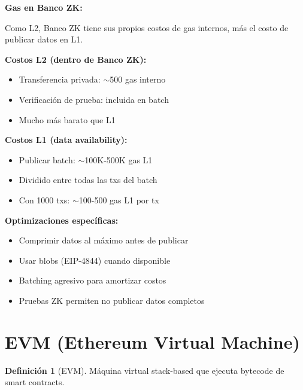 \documentclass[11pt,a4paper,twoside,openright]{book}
\theoremstyle{definition}
\newtheorem{definition}{Definición}[chapter]
\theoremstyle{plain}
\theoremstyle{remark}
\begin{document}
\begin{bancozk}
\textbf{Gas en Banco ZK:}

Como L2, Banco ZK tiene sus propios costos de gas internos, más el costo de publicar datos en L1.

\textbf{Costos L2 (dentro de Banco ZK):}
\begin{itemize}
    \item Transferencia privada: $\sim$500 gas interno
    \item Verificación de prueba: incluida en batch
    \item Mucho más barato que L1
\end{itemize}

\textbf{Costos L1 (data availability):}
\begin{itemize}
    \item Publicar batch: $\sim$100K-500K gas L1
    \item Dividido entre todas las txs del batch
    \item Con 1000 txs: $\sim$100-500 gas L1 por tx
\end{itemize}

\textbf{Optimizaciones específicas:}
\begin{itemize}
    \item Comprimir datos al máximo antes de publicar
    \item Usar blobs (EIP-4844) cuando disponible
    \item Batching agresivo para amortizar costos
    \item Pruebas ZK permiten no publicar datos completos
\end{itemize}
\end{bancozk}


\section{EVM (Ethereum Virtual Machine)}

\begin{definition}[EVM]
Máquina virtual stack-based que ejecuta bytecode de smart contracts.
\end{definition}
\end{document}
